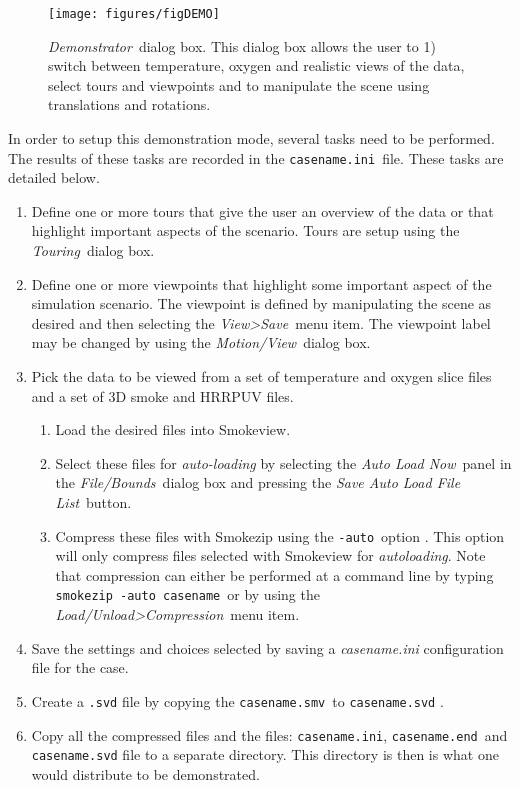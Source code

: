 \documentclass[11pt,twoside]{book}
\newcommand{\figoptions}{hbp}
\begin{document}
\begin{figure}[\figoptions]
\begin{center}
\texttt{[image: figures/figDEMO]}
\end{center}
\caption[{\em Demonstrator}\ dialog box.]{{\em Demonstrator}\ dialog box.
This dialog box allows the user to 1) switch between temperature, oxygen and realistic views of the data,
select tours and viewpoints
 and to manipulate the scene using translations and rotations.} \label{figDEMO}
\end{figure}

In order to setup this demonstration mode, several tasks need to be performed.  The results of these tasks are
recorded in the {\tt casename.ini}\ file.
These tasks are detailed below.

\begin{enumerate}
  \item Define one or more tours that give the user an overview of the data or that highlight important
  aspects of the scenario.   Tours are setup using the {\em Touring}\ dialog box.
  \item Define one or more viewpoints that highlight some important
  aspect of the simulation scenario.  The viewpoint is defined by manipulating the scene as desired and then selecting the {\em View>Save}\ menu item.  The viewpoint label may be changed by using the {\em Motion/View}\ dialog box.
  \item Pick the data to be viewed from a set of temperature and oxygen slice files and a set of 3D smoke and HRRPUV files.
  \begin{enumerate}
    \item Load the desired files into Smokeview.
    \item Select these files for {\em auto-loading} by selecting the {\em Auto Load Now}\ panel
    in the {\em File/Bounds}\ dialog box and pressing the {\em Save Auto Load File List}\ button.
    \item Compress these files with Smokezip using the {\tt -auto}\ option .  This option will only compress files selected with Smokeview for {\em autoloading}.  Note that compression can either be performed at a command line by typing {\tt smokezip -auto casename}\ or by using the {\em Load/Unload>Compression}\ menu item.
      \end{enumerate}
  \item Save the settings and choices selected by saving a {\em casename.ini} configuration file for the case.
  \item Create a {\tt .svd} file by copying the {\tt casename.smv}\ to {\tt casename.svd} .
  \item Copy all the compressed files and the files: {\tt casename.ini}, {\tt casename.end}\ and {\tt casename.svd} file to a separate directory.  This directory is then is what one would distribute to be demonstrated.
\end{enumerate}
\end{document}
